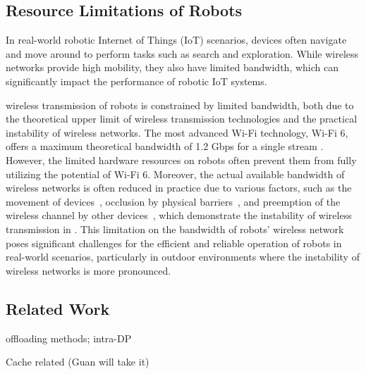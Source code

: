\subsection{Resource Limitations of Robots}
In real-world robotic Internet of Things (IoT) scenarios, devices often navigate and move around to perform tasks such as search and exploration. While wireless networks provide high mobility, they also have limited bandwidth, which can significantly impact the performance of robotic IoT systems.

wireless transmission of robots is constrained by limited bandwidth, both due to the theoretical upper limit of wireless transmission technologies and the practical instability of wireless networks. 
The most advanced Wi-Fi technology, Wi-Fi 6, offers a maximum theoretical bandwidth of 1.2 Gbps for a single stream \cite{liu2023first}. However, the limited hardware resources on robots often prevent them from fully utilizing the potential of Wi-Fi 6\cite{yang2022mobile}. Moreover, the actual available bandwidth of wireless networks is often reduced in practice due to various factors, such as the movement of devices~\cite{masiukiewicz2019throughput, pei2013connectivity}, occlusion by physical barriers~\cite{ding2015performance, sarkar2013effect}, and preemption of the wireless channel by other devices~\cite{adame2021time, ren2018proportional}, which demonstrate the instability of wireless transmission in \cite{sun2024hybridparallel}.
This limitation on the bandwidth of robots' wireless network poses significant challenges for the efficient and reliable operation of robots in real-world scenarios, particularly in outdoor environments where the instability of wireless networks is more pronounced.

\subsection{Related Work}
offloading methods; intra-DP

Cache related (Guan will take it)